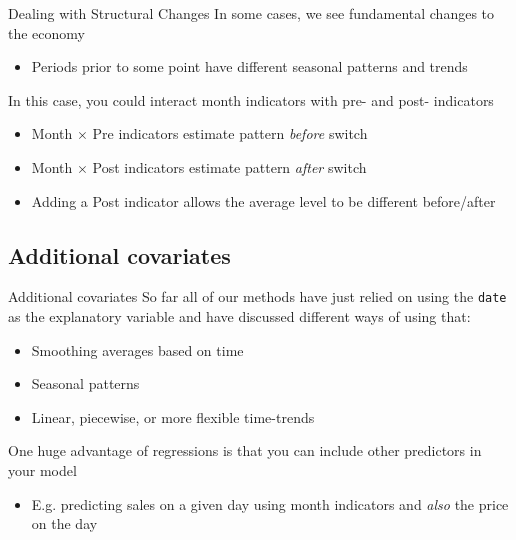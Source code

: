 \documentclass[aspectratio=169,t,11pt,table]{beamer}
\begin{document}
\begin{frame}{Dealing with Structural Changes}
  In some cases, we see fundamental changes to the economy
  \begin{itemize}
    \item Periods prior to some point have different seasonal patterns and trends
  \end{itemize}

  \bigskip
  In this case, you could interact month indicators with pre- and post- indicators 
  \begin{itemize}
    \item Month $\times$ Pre indicators estimate pattern \emph{before} switch
    \item Month $\times$ Post indicators estimate pattern \emph{after} switch
    
    \item Adding a Post indicator allows the average level to be different before/after
  \end{itemize}
\end{frame}


\subsection{Additional covariates}

\begin{frame}{Additional covariates}
  So far all of our methods have just relied on using the \texttt{date} as the explanatory variable and have discussed different ways of using that:
  \begin{itemize}
    \item Smoothing averages based on time
    \item Seasonal patterns
    \item Linear, piecewise, or more flexible time-trends
  \end{itemize}

  \bigskip
  One huge advantage of regressions is that you can include other predictors in your model
  \begin{itemize}
    \item E.g. predicting sales on a given day using month indicators and \emph{also} the price on the day
  \end{itemize}  
\end{frame}
\end{document}
